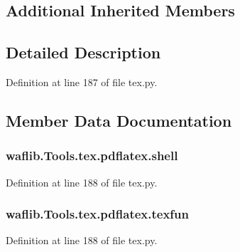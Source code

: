 \subsection*{Additional Inherited Members}


\subsection{Detailed Description}


Definition at line 187 of file tex.\+py.



\subsection{Member Data Documentation}
\subsubsection[{\texorpdfstring{shell}{shell}}]{\setlength{\rightskip}{0pt plus 5cm}waflib.\+Tools.\+tex.\+pdflatex.\+shell\hspace{0.3cm}{\ttfamily [static]}}\hypertarget{classwaflib_1_1_tools_1_1tex_1_1pdflatex_acbe0f123879510fb095ea9f5682a7e79}{}\label{classwaflib_1_1_tools_1_1tex_1_1pdflatex_acbe0f123879510fb095ea9f5682a7e79}


Definition at line 188 of file tex.\+py.

\subsubsection[{\texorpdfstring{texfun}{texfun}}]{\setlength{\rightskip}{0pt plus 5cm}waflib.\+Tools.\+tex.\+pdflatex.\+texfun\hspace{0.3cm}{\ttfamily [static]}}\hypertarget{classwaflib_1_1_tools_1_1tex_1_1pdflatex_a2df1898d0457bb836430bbb93f0af922}{}\label{classwaflib_1_1_tools_1_1tex_1_1pdflatex_a2df1898d0457bb836430bbb93f0af922}


Definition at line 188 of file tex.\+py.

